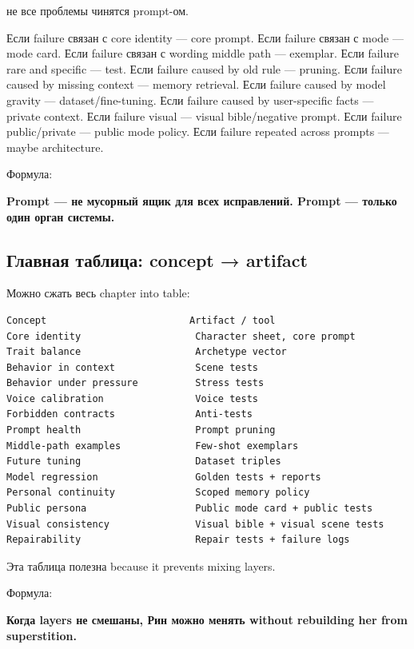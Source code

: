 не все проблемы чинятся prompt-ом.

Если failure связан с core identity --- core prompt. Если failure связан
с mode --- mode card. Если failure связан с wording middle path ---
exemplar. Если failure rare and specific --- test. Если failure caused
by old rule --- pruning. Если failure caused by missing context ---
memory retrieval. Если failure caused by model gravity ---
dataset/\hspace{0pt}fine-tuning. Если failure caused by user-specific facts ---
private context. Если failure visual --- visual bible/\hspace{0pt}negative prompt.
Если failure public/\hspace{0pt}private --- public mode policy. Если failure
repeated across prompts --- maybe architecture.

Формула:

\textbf{Prompt --- не мусорный ящик для всех исправлений. Prompt ---
только один орган системы.}

\subsection*{Главная таблица: concept → artifact}

Можно сжать весь chapter into table:

\begin{Verbatim}
Concept                         Artifact / tool
Core identity                    Character sheet, core prompt
Trait balance                    Archetype vector
Behavior in context              Scene tests
Behavior under pressure          Stress tests
Voice calibration                Voice tests
Forbidden contracts              Anti-tests
Prompt health                    Prompt pruning
Middle-path examples             Few-shot exemplars
Future tuning                    Dataset triples
Model regression                 Golden tests + reports
Personal continuity              Scoped memory policy
Public persona                   Public mode card + public tests
Visual consistency               Visual bible + visual scene tests
Repairability                    Repair tests + failure logs
\end{Verbatim}

Эта таблица полезна because it prevents mixing layers.

Формула:

\textbf{Когда layers не смешаны, Рин можно менять without rebuilding her
from superstition.}

